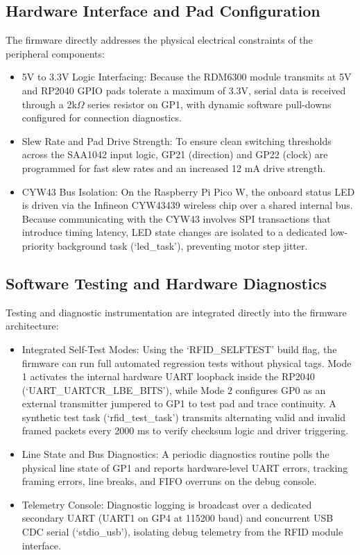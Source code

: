 \subsection{Hardware Interface and Pad Configuration}
The firmware directly addresses the physical electrical constraints of the peripheral components:
\begin{itemize}
    \item 5V to 3.3V Logic Interfacing: Because the RDM6300 module transmits at 5V and RP2040 GPIO pads tolerate a maximum of 3.3V, serial data is received through a 2k$\Omega$ series resistor on GP1, with dynamic software pull-downs configured for connection diagnostics.
    \item Slew Rate and Pad Drive Strength: To ensure clean switching thresholds across the SAA1042 input logic, GP21 (direction) and GP22 (clock) are programmed for fast slew rates and an increased 12 mA drive strength.
    \item CYW43 Bus Isolation: On the Raspberry Pi Pico W, the onboard status LED is driven via the Infineon CYW43439 wireless chip over a shared internal bus. Because communicating with the CYW43 involves SPI transactions that introduce timing latency, LED state changes are isolated to a dedicated low-priority background task (`led\_task'), preventing motor step jitter.
\end{itemize}

\subsection{Software Testing and Hardware Diagnostics}
Testing and diagnostic instrumentation are integrated directly into the firmware architecture:
\begin{itemize}
    \item Integrated Self-Test Modes: Using the `RFID\_SELFTEST' build flag, the firmware can run full automated regression tests without physical tags. Mode 1 activates the internal hardware UART loopback inside the RP2040 (`UART\_UARTCR\_LBE\_BITS'), while Mode 2 configures GP0 as an external transmitter jumpered to GP1 to test pad and trace continuity. A synthetic test task (`rfid\_test\_task') transmits alternating valid and invalid framed packets every 2000 ms to verify checksum logic and driver triggering.
    \item Line State and Bus Diagnostics: A periodic diagnostics routine polls the physical line state of GP1 and reports hardware-level UART errors, tracking framing errors, line breaks, and FIFO overruns on the debug console.
    \item Telemetry Console: Diagnostic logging is broadcast over a dedicated secondary UART (UART1 on GP4 at 115200 baud) and concurrent USB CDC serial (`stdio\_usb'), isolating debug telemetry from the RFID module interface.
\end{itemize}

